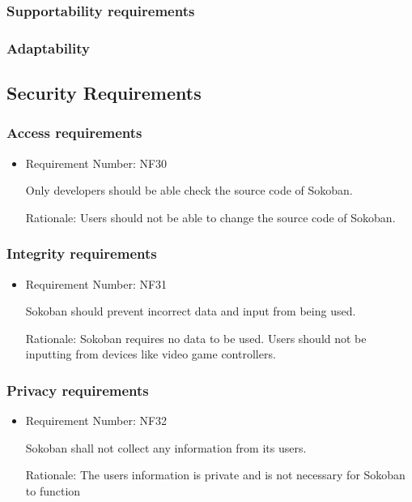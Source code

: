\documentclass[12pt, titlepage]{article}
\begin{document}
\subsubsection{Supportability requirements}
\subsubsection{Adaptability}

\subsection{Security Requirements}
\subsubsection{Access requirements}

\begin{itemize}
    \item Requirement Number: NF30
    
Only developers should be able check the source code of Sokoban.
     
    Rationale: Users should not be able to change the source code of Sokoban.
\end{itemize}

\subsubsection{Integrity requirements}

\begin{itemize}
    \item Requirement Number: NF31
    
Sokoban should prevent incorrect data and input from being used.
     
    Rationale: Sokoban requires no data to be used. Users should not be inputting from devices like video game controllers.
\end{itemize}



\subsubsection{Privacy requirements}

\begin{itemize}
    \item Requirement Number: NF32
    
Sokoban shall not collect any information from its users.
     
    Rationale: The users information is private and is not necessary for Sokoban to function
\end{itemize}
\end{document}

